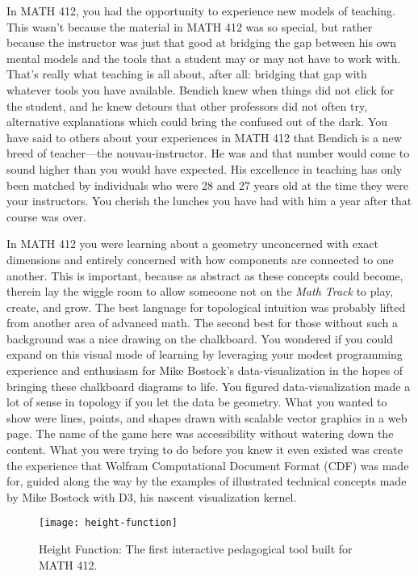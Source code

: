 \documentclass[../main.tex]{subfiles}
\begin{document}
In MATH 412, you had the opportunity to experience new models of teaching. This wasn't because the material in MATH 412 was so special, but rather because the instructor was just that good at bridging the gap between his own mental models and the tools that a student may or may not have to work with. That's really what teaching is all about, after all: bridging that gap with whatever tools you have available. Bendich knew when things did not click for the student, and he knew detours that other professors did not often try, alternative explanations which could bring the confused out of the dark. You have said to others about your experiences in MATH 412 that Bendich is a new breed of teacher---the nouvau-instructor. He was  and that number would come to sound higher than you would have expected. His excellence in teaching has only been matched by individuals who were 28 and 27 years old at the time they were your instructors. You cherish the lunches you have had with him a year after that course was over.

In MATH 412 you were learning about a geometry unconcerned with exact dimensions and entirely concerned with how components are connected to one another. This is important, because as abstract as these concepts could become, therein lay the wiggle room to allow someoone not on the \textit{Math Track} to play, create, and grow. The best language for topological intuition was probably lifted from another area of advanced math. The second best for those without such a background was a nice drawing on the chalkboard. You wondered if you could expand on this visual mode of learning by leveraging your modest programming experience and enthusiasm for Mike Bostock's data-visualization in the hopes of bringing these chalkboard diagrams to life. You figured data-visualization made a lot of sense in topology if you let the data be geometry. What you wanted to show were lines, points, and shapes drawn with scalable vector graphics in a web page. The name of the game here was accessibility without watering down the content. What you were trying to do before you knew it even existed was create the experience that Wolfram Computational Document Format (CDF) was made for, guided along the way by the examples of illustrated technical concepts made by Mike Bostock with D3, his nascent visualization kernel.

\begin{figure}[h!]
	\centering
	\texttt{[image: height-function]}
	\caption*{Height Function: The first interactive pedagogical tool built for MATH 412.}
\end{figure}
\end{document}
